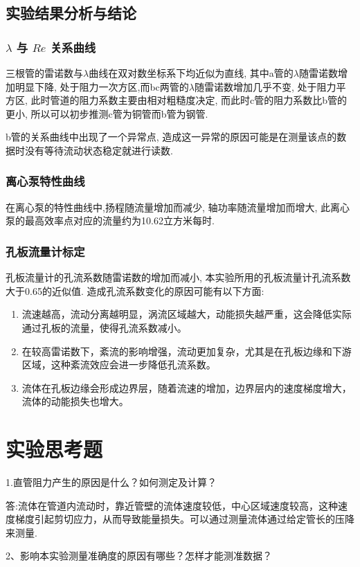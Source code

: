 \documentclass[a4paper,UTF8]{ctexrep}
\theoremstyle{plain}
\theoremstyle{definition}
\numberwithin{equation}{chapter}
\begin{document}
\subsection{实验结果分析与结论}
\subsubsection{$\lambda$ 与 $Re$ 关系曲线}
三根管的雷诺数与$\lambda$曲线在双对数坐标系下均近似为直线, 其中a管的$\lambda$随雷诺数增加明显下降, 处于阻力一次方区,而bc两管的$\lambda$随雷诺数增加几乎不变, 处于阻力平方区, 此时管道的阻力系数主要由相对粗糙度决定, 而此时c管的阻力系数比b管的更小, 所以可以初步推测c管为铜管而b管为钢管.

b管的关系曲线中出现了一个异常点, 造成这一异常的原因可能是在测量该点的数据时没有等待流动状态稳定就进行读数.

\subsubsection{离心泵特性曲线}
在离心泵的特性曲线中,扬程随流量增加而减少, 轴功率随流量增加而增大, 此离心泵的最高效率点对应的流量约为10.62立方米每时.
\subsubsection{孔板流量计标定}
孔板流量计的孔流系数随雷诺数的增加而减小, 本实验所用的孔板流量计孔流系数大于0.65的近似值. 造成孔流系数变化的原因可能有以下方面:
\begin{enumerate}
    \item 流速越高，流动分离越明显，涡流区域越大，动能损失越严重，这会降低实际通过孔板的流量，使得孔流系数减小。
    \item 在较高雷诺数下，紊流的影响增强，流动更加复杂，尤其是在孔板边缘和下游区域，这种紊流效应会进一步降低孔流系数。
    \item 流体在孔板边缘会形成边界层，随着流速的增加，边界层内的速度梯度增大，流体的动能损失也增大。
\end{enumerate}
        \section{实验思考题}
	1.直管阻力产生的原因是什么？如何测定及计算？

    答:流体在管道内流动时，靠近管壁的流体速度较低，中心区域速度较高，这种速度梯度引起剪切应力，从而导致能量损失。可以通过测量流体通过给定管长的压降来测量.

    2、影响本实验测量准确度的原因有哪些？怎样才能测准数据？
    
\end{document}

